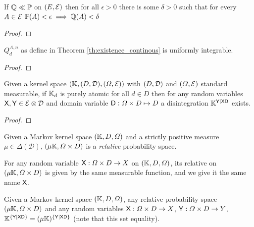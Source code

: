 \begin{lemma}\label{lem:absolute_continuity}
If $\mathbb{Q}\ll\mathbb{P}$ on $(E,\mathcal{E})$ then for all $\epsilon>0$ there is some $\delta>0$ such that for every $A\in\mathcal{E}$ $\mathbb{P}(A)<\epsilon\implies \mathbb{Q}(A)<\delta$
\end{lemma}

\begin{proof}
\end{proof}

\begin{lemma}\label{lem:uniform_integrability}
$Q^{A,n}_d$ as define in Theorem \ref{th:existence_continous} is uniformly integrable.
\end{lemma}

\begin{proof}
\end{proof}

\begin{theorem}
Given a kernel space $(\mathbb{K},(D,\mathcal{D}),(\Omega,\mathcal{E}))$ with $(D,\mathcal{D})$ and $(\Omega,\mathcal{E})$ standard measurable, if $\mathbb{K}_d$ is purely atomic for all $d\in D$ then for any random variables $\mathsf{X},\mathsf{Y}\in \mathcal{E}\otimes\mathcal{D}$ and domain variable $\mathsf{D}:\Omega\times D\mapsto D$ a disintegration $\mathbb{K}^{\mathsf{Y}|\mathsf{X}\mathsf{D}}$ exists.
\end{theorem}

\begin{proof}
\end{proof}

\begin{definition}


Given a Markov kernel space $(\mathbb{K},D,\Omega)$ and a strictly positive measure $\mu\in \Delta(\mathcal{D})$, $(\mu\mathbb{K},\Omega\times D)$ is a \emph{relative} probability space.

For any random variable $\mathsf{X}:\Omega\times D\to X$ on $(\mathbb{K},D,\Omega)$, its relative on $(\mu\mathbb{K},\Omega\times D)$ is given by the same measurable function, and we give it the same name $\mathsf{X}$.
\end{definition}


\begin{lemma}\label{lem:agree_disint}
Given a Markov kernel space $(\mathbb{K},D,\Omega)$, any relative probability space $(\mu\mathbb{K},\Omega\times D)$ and any random variables $\mathsf{X}:\Omega\times D\to X$, $\mathsf{Y}:\Omega\times D\to Y$, $\mathbb{K}^{\{\mathsf{Y}|\mathsf{X}\mathsf{D}\}}=(\mu\mathbb{K})^{\{\mathsf{Y}|\mathsf{X}\mathsf{D}\}}$ (note that this set equality).
\end{lemma}

